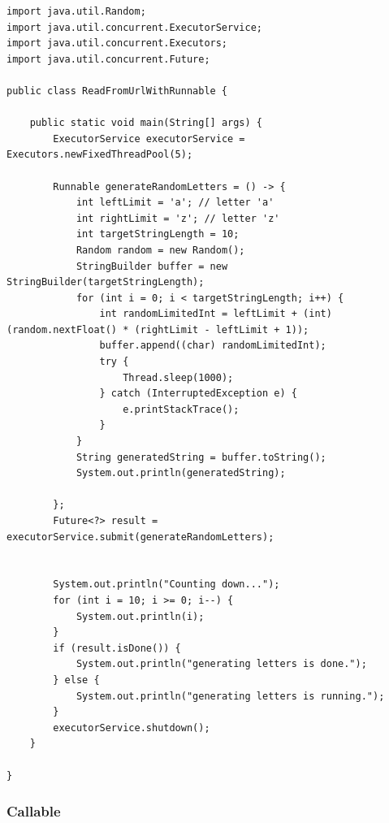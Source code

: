 \documentclass{tstextbook}
\begin{document}
\begin{lstlisting}
import java.util.Random;
import java.util.concurrent.ExecutorService;
import java.util.concurrent.Executors;
import java.util.concurrent.Future;

public class ReadFromUrlWithRunnable {

	public static void main(String[] args) {
		ExecutorService executorService = Executors.newFixedThreadPool(5);

		Runnable generateRandomLetters = () -> {
			int leftLimit = 'a'; // letter 'a'
			int rightLimit = 'z'; // letter 'z'
			int targetStringLength = 10;
			Random random = new Random();
			StringBuilder buffer = new StringBuilder(targetStringLength);
			for (int i = 0; i < targetStringLength; i++) {
				int randomLimitedInt = leftLimit + (int) (random.nextFloat() * (rightLimit - leftLimit + 1));
				buffer.append((char) randomLimitedInt);
				try {
					Thread.sleep(1000);
				} catch (InterruptedException e) {
					e.printStackTrace();
				}
			}
			String generatedString = buffer.toString();
			System.out.println(generatedString);

		};
		Future<?> result = executorService.submit(generateRandomLetters);


		System.out.println("Counting down...");
		for (int i = 10; i >= 0; i--) {
			System.out.println(i);
		}
		if (result.isDone()) {
			System.out.println("generating letters is done.");
		} else {
			System.out.println("generating letters is running.");
		}
		executorService.shutdown();
	}

}
\end{lstlisting}


\subsubsection{Callable}
\end{document}
